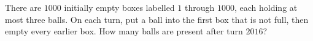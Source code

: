 There are $1000$ initially empty boxes labelled $1$ through $1000$, each holding at most three balls. On each turn, put a ball into the first box that is not full, then empty every earlier box. How many balls are present after turn $2016$?
